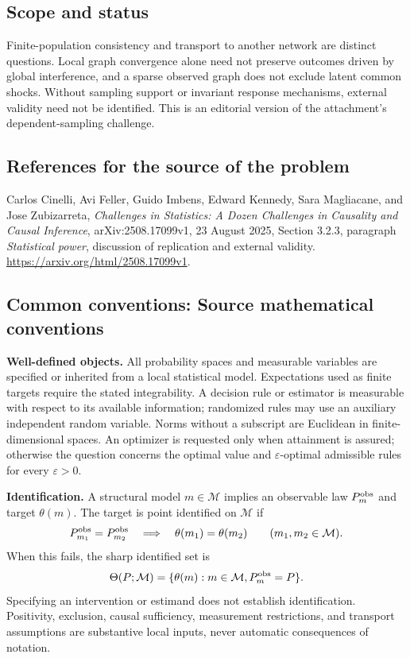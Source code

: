 \documentclass[11pt,a4paper]{article}
\begin{document}
\subsection*{Scope and status}
Finite-population consistency and transport to another network are distinct questions. Local graph convergence alone need not preserve outcomes driven by global interference, and a sparse observed graph does not exclude latent common shocks. Without sampling support or invariant response mechanisms, external validity need not be identified. This is an editorial version of the attachment's dependent-sampling challenge.
\subsection*{References for the source of the problem}
Carlos Cinelli, Avi Feller, Guido Imbens, Edward Kennedy, Sara Magliacane, and Jose Zubizarreta, \emph{Challenges in Statistics: A Dozen Challenges in Causality and Causal Inference}, arXiv:2508.17099v1, 23 August 2025, Section 3.2.3, paragraph \emph{Statistical power}, discussion of replication and external validity. \url{https://arxiv.org/html/2508.17099v1}.

\subsection*{Common conventions: Source mathematical conventions}

\textbf{Well-defined objects.}
All probability spaces and measurable variables are specified or inherited
from a local statistical model. Expectations used as finite targets require
the stated integrability. A decision rule or estimator is measurable with
respect to its available information; randomized rules may use an auxiliary
independent random variable. Norms without a subscript are Euclidean in
finite-dimensional spaces. An optimizer is requested only when attainment
is assured; otherwise the question concerns the optimal value and
$\varepsilon$-optimal admissible rules for every $\varepsilon>0$.

\textbf{Identification.}
A structural model $m\in\mathcal M$ implies an observable law
$P_m^{\rm obs}$ and target $\theta(m)$. The target is point identified on
$\mathcal M$ if
\[
 P_{m_1}^{\rm obs}=P_{m_2}^{\rm obs}
 \quad\Longrightarrow\quad\theta(m_1)=\theta(m_2)
 \qquad(m_1,m_2\in\mathcal M).
\]
When this fails, the sharp identified set is
\[
 \Theta(P;\mathcal M)=\{\theta(m):m\in\mathcal M,
                                  P_m^{\rm obs}=P\}.
\]
Specifying an intervention or estimand does not establish identification.
Positivity, exclusion, causal sufficiency, measurement restrictions, and
transport assumptions are substantive local inputs, never automatic
consequences of notation.
\end{document}
